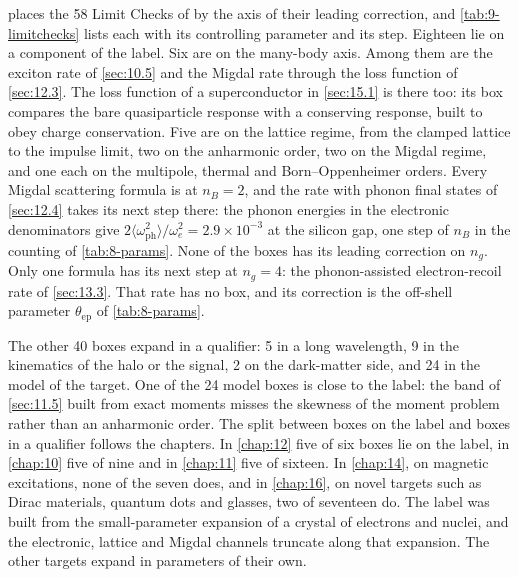  places the 58 Limit Checks of  by the axis of their leading correction, and \cref{tab:9-limitchecks} lists each with its controlling parameter and its step. Eighteen lie on a component of the label. Six are on the many-body axis. Among them are the exciton rate of \cref{sec:10.5} and the Migdal rate through the loss function of \cref{sec:12.3}. The loss function of a superconductor in \cref{sec:15.1} is there too: its box compares the bare quasiparticle response with a conserving response, built to obey charge conservation. Five are on the lattice regime, from the clamped lattice to the impulse limit, two on the anharmonic order, two on the Migdal regime, and one each on the multipole, thermal and Born--Oppenheimer orders. Every Migdal scattering formula is at $n_B = 2$, and the rate with phonon final states of \cref{sec:12.4} takes its next step there: the phonon energies in the electronic denominators give $2\langle\omega_{\mathrm{ph}}^2\rangle/\omega_e^2 = 2.9\times10^{-3}$ at the silicon gap, one step of $n_B$ in the counting of \cref{tab:8-params}. None of the boxes has its leading correction on $n_g$. Only one formula has its next step at $n_g = 4$: the phonon-assisted electron-recoil rate of \cref{sec:13.3}. That rate has no box, and its correction is the off-shell parameter $\theta_{\mathrm{ep}}$ of \cref{tab:8-params}.

The other 40 boxes expand in a qualifier: 5 in a long wavelength, 9 in the kinematics of the halo or the signal, 2 on the dark-matter side, and 24 in the model of the target. One of the 24 model boxes is close to the label: the band of \cref{sec:11.5} built from exact moments misses the skewness of the moment problem rather than an anharmonic order. The split between boxes on the label and boxes in a qualifier follows the chapters. In \cref{chap:12} five of six boxes lie on the label, in \cref{chap:10} five of nine and in \cref{chap:11} five of sixteen. In \cref{chap:14}, on magnetic excitations, none of the seven does, and in \cref{chap:16}, on novel targets such as Dirac materials, quantum dots and glasses, two of seventeen do. The label was built from the small-parameter expansion of a crystal of electrons and nuclei, and the electronic, lattice and Migdal channels truncate along that expansion. The other targets expand in parameters of their own.

